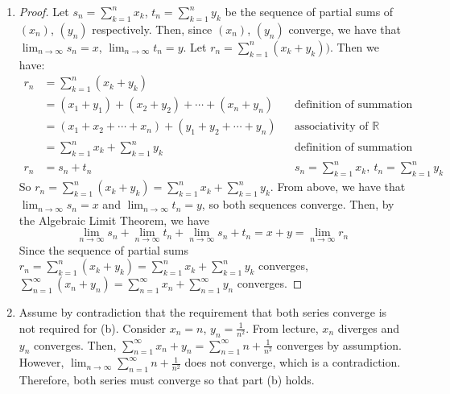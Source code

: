 \documentclass[13pt]{article}
\begin{document}
\begin{enumerate}[label=(\alph*)]
\item
  \begin{proof}
    Let $s_{n} = \sum_{k = 1}^{n} x_{k}$, $t_{n} = \sum_{k = 1}^{n}
    y_{k}$ be the sequence of partial sums of $(x_{n})$, $(y_{n})$
    respectively. Then, since $(x_{n})$, $(y_{n})$ converge, we have
    that $\lim_{n \rightarrow \infty} s_{n} = x$, $\lim_{n \rightarrow
      \infty} t_{n} = y$. Let $r_{n} = \sum_{k = 1}^{n} (x_{k} +
    y_{k}))$. Then we have:
    \begin{align*}
      r_{n} &= \sum_{k = 1}^{n} (x_{k} + y_{k}) \\
            &= (x_{1} + y_{1}) + (x_{2} + y_{2}) + \cdots + (x_{n} +
              y_{n}) && \text{definition of summation} \\
            &= (x_{1} + x_{2} + \cdots + x_{n}) + (y_{1} + y_{2} +
              \cdots + y_{n}) && \text{associativity of } \mathbb{R} \\
            &= \sum_{k = 1}^{n} x_{k} + \sum_{k = 1}^{n} y_{k} &&
                                                                  \text{definition
                                                                  of
                                                                  summation} \\
      r_{n} &= s_{n} + t_{n} && s_{n} = \sum_{k = 1}^{n} x_{k}, \ t_{n}
                                = \sum_{k = 1}^{n} y_{k}
    \end{align*}
    So $r_{n} = \sum_{k = 1}^{n} (x_{k} + y_{k}) = \sum_{k = 1}^{n}
    x_{k} + \sum_{k = 1}^{n} y_{k}$. From above, we have that $\lim_{n
      \rightarrow \infty} s_{n} = x$ and $\lim_{n
      \rightarrow \infty} t_{n} = y$, so both sequences converge. Then,
    by the Algebraic Limit Theorem, we have \[\lim_{n \rightarrow \infty}
      s_{n} + \lim_{n \rightarrow \infty} t_{n} + \lim_{n \rightarrow
        \infty} s_{n} + t_{n} = x + y = \lim_{n \rightarrow \infty}
      r_{n}\] Since the sequence of partial sums $r_{n} = \sum_{k = 1}^{n}
    (x_{k} + y_{k}) = \sum_{k = 1}^{n} x_{k} + \sum_{k = 1}^{n} y_{k}$
    converges, $\sum_{n = 1}^{\infty} (x_{n} + y_{n}) = \sum_{n = 1}^{\infty} x_{n}
    + \sum_{n = 1}^{\infty} y_{n}$ converges.
  \end{proof}
  
\item Assume by contradiction that the requirement that both series
  converge is not required for (b). Consider $x_n = n$, $y_n =
  \frac{1}{n^2}$. From lecture, $x_n$ diverges and $y_n$
  converges. Then, $\sum_{n = 1}^{\infty} x_n + y_n = \sum_{n = 
    1}^{\infty} n + \frac{1}{n^2}$ converges by assumption. However,
  $\lim_{n \rightarrow \infty} \sum_{n = 1}^{\infty} n +
  \frac{1}{n^2}$ does not converge, which is a
  contradiction. Therefore, both series must converge so that part (b)
  holds.
  

\end{enumerate}
\end{document}
